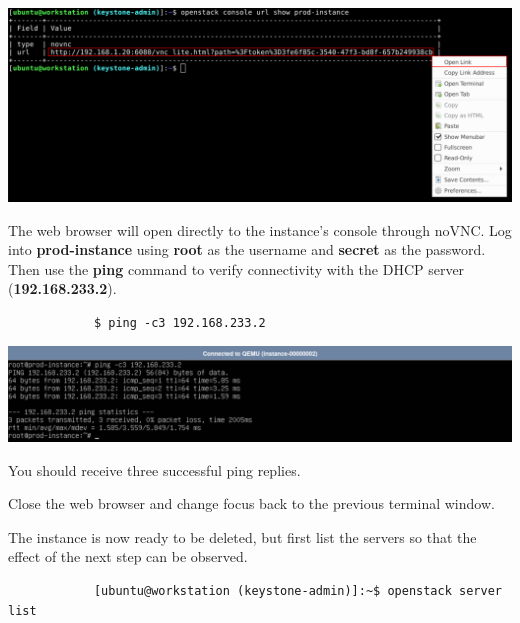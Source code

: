 \documentclass[letterpaper, 12pt]{article}
\begin{document}
\begin{enumerate}
\begin{labstep}
        \begin{center}
            \includegraphics[width=\linewidth]{images/part2/step10.png}
        \end{center}
    \end{labstep}

    \begin{labstep}
        The web browser will open directly to the instance's console through noVNC.
        Log into \textbf{prod-instance} using \textbf{root} as the username and \textbf{secret} as the password.
        Then use the \textbf{ping} command to verify connectivity with the DHCP server (\textbf{192.168.233.2}).
        \begin{lstlisting}
            $ ping -c3 192.168.233.2
        \end{lstlisting}

        \begin{center}
            \includegraphics[width=\linewidth]{images/part2/step11.png}
        \end{center}
    \end{labstep}

    \begin{notebox}
        You should receive three successful ping replies.
    \end{notebox}

    \begin{labstep}
        Close the web browser and change focus back to the previous terminal window.
    \end{labstep}

    \begin{labstep}
        The instance is now ready to be deleted, but first list the servers so that the effect of the next step can be observed.
        \begin{lstlisting}
            [ubuntu@workstation (keystone-admin)]:~$ openstack server list
        \end{lstlisting}


\end{labstep}
\end{enumerate}
\end{document}
